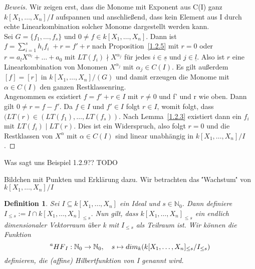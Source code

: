 \documentclass{article}
\newtheorem{definition}[satz]{Definition}
\newcommand*{\R}{k[X_{1},\ldots,X_{n}]}
\begin{document}
	\begin{proof}[Beweis]
	Wir zeigen erst, dass die Monome mit Exponent aus C(I) ganz \(k[X_{1},\ldots,X_{n}]/I\) 
	aufspannen und anschließend, dass kein Element aus I durch echte Linearkombination solcher
	Monome dargestellt werden kann. \\
	Sei \(G = \{f_{1}, \ldots, f_{s}\}\) und \(0 \neq f \in \R\). Dann ist
	\(f = \sum_{i=1}^{s} h_{i}f_{i}\; + r = f' + r\) nach Proposition~\ref{1.2.5} mit \(r=0\) oder 
	\(r = a_{l}X^{\alpha_{l}} + \ldots + a_{0}\) mit \(LT(f_{i}) \nmid X^{\alpha_{j}}\) 
	für jedes \(i \in \underline{s}\) und \(j \in \underline{l}\). Also ist \(r\) eine
	Linearkombination von Monomen \(X^{\alpha_{j}}\) mit \(\alpha_{j} \in C(I)\).
	Es gilt außerdem \([f] = [r]\) in \(\R/(G)\) und damit erzeugen die
	Monome mit \(\alpha \in C(I)\) den ganzen Restklassenring. \\
	Angenommen es existiert \(f = f' + r \in I\) mit \(r \neq 0\) und f' und r wie oben.
	Dann gilt \(0 \neq r = f - f'\). Da \(f \in I\) und \(f' \in I\) folgt
	\(r \in I\), womit folgt, dass \((LT(r) \in (LT(f_{1}), \ldots, LT(f_{s}))\).
	Nach Lemma~\ref{1.2.3} existiert dann ein \(f_{i}\) mit \(LT(f_{i})\; |\; LT(r)\). Dies ist 
	ein Widerspruch, also folgt \(r = 0\) und die Restklassen von \(X^{\alpha}\) mit
	\(\alpha \in C(I)\) sind linear unabhängig in \(\R/I\).
	\end{proof}

	Was sagt uns Beispiel 1.2.9?? TODO

	Bildchen mit Punkten und Erklärung dazu.
	Wir betrachten das \''Wachstum\'' von \(\R/I\)

	\begin{definition} \label{1.2.11}
	Sei \(I \subseteq \R\) ein Ideal und \(s \in \mathbb{N}_{0}\). Dann definiere \(I_{\leq s} :=
	I \cap \R_{\leq s}\). Nun gilt, dass \(\R_{\leq s}\) ein endlich dimensionaler Vektorraum über
	k  mit \(I_{\leq s}\) als Teilraum ist. Wir können die Funktion \begin{displaymath}
	\prescript{a}{}{HF}_{I} : \mathbb{N}_{0} \rightarrow \mathbb{N}_{0}, \quad s \mapsto
	dim_{k}(\R_{\leq s}/I_{\leq s})	\end{displaymath} definieren, die (affine) Hilbertfunktion
	von I genannt wird.
	\end{definition}
\end{document}

